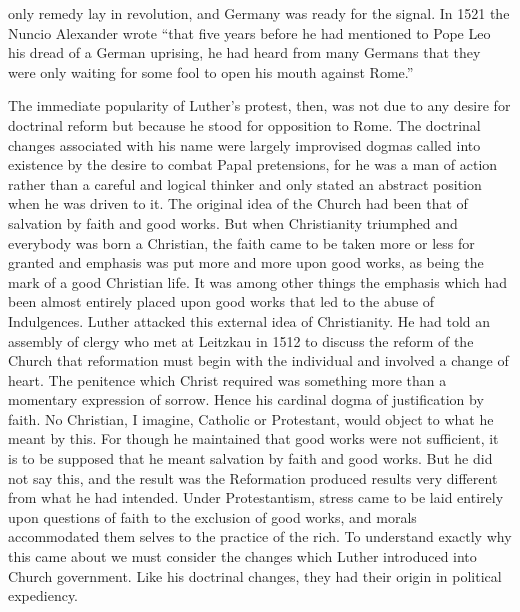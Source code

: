 \documentclass{book}
\begin{document}
only remedy lay in revolution, and Germany was ready for the signal. In 1521 the Nuncio Alexander wrote “that five years before he had mentioned to Pope Leo his dread of a German uprising, he had heard from many Germans that they were only waiting for some fool to open his mouth against Rome.”\footnotemark[1]

The immediate popularity of Luther’s protest, then, was not due to any desire for doctrinal reform but because he stood for opposition to Rome. The doctrinal changes associated with his name were largely improvised dogmas called into existence by the desire to combat Papal pretensions, for he was a man of action rather than a careful and logical thinker and only stated an abstract position when he was driven to it. The original idea of the Church had been that of salvation by faith and good works. But when Christianity triumphed and everybody was born a Christian, the faith came to be taken more or less for granted and emphasis was put more and more upon good works, as being the mark of a good Christian life. It was among other things the emphasis which had been almost entirely placed upon good works that led to the abuse of Indulgences. Luther attacked this external idea of Christianity. He had told an assembly of clergy who met at Leitzkau in 1512 to discuss the reform of the Church that reformation must begin with the individual and involved a change of heart. The penitence which Christ required was something more than a momentary expression of sorrow. Hence his cardinal dogma of justification by faith. No Christian, I imagine, Catholic or Protestant, would object to what he meant by this. For though he maintained that good works were not sufficient, it is to be supposed that he meant salvation by faith and good works. But he did not say this, and the result was the Reformation produced results very different from what he had intended. Under Protestantism, stress came to be laid entirely upon questions of faith to the exclusion of good works, and morals accommodated them selves to the practice of the rich. To understand exactly why this came about we must consider the changes which Luther introduced into Church government. Like his doctrinal changes, they had their origin in political expediency.
\end{document}

